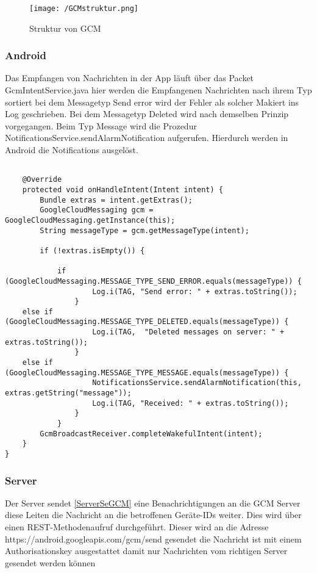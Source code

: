 \begin{figure}[H]
\centering
\texttt{[image: /GCMstruktur.png]}
\caption{Struktur von GCM}
\label{fig:GCMstrukutr}
\end{figure}

\subsubsection*{Android}
Das Empfangen von Nachrichten in der App läuft über das Packet GcmIntentService.java hier werden die Empfangenen Nachrichten nach ihrem Typ sortiert bei dem Messagetyp Send error wird der Fehler als solcher Makiert ins Log geschrieben. Bei dem Messagetyp Deleted wird nach demselben Prinzip vorgegangen. Beim Typ Message wird die Prozedur NotificationsService.sendAlarmNotification aufgerufen. Hierdurch werden in Android die Notifications ausgelöst.\\

\begin{lstlisting}[caption={Empfangen von GCM Nachrichten unter Android},label=lst:GCMget]

    @Override
    protected void onHandleIntent(Intent intent) {
        Bundle extras = intent.getExtras();
        GoogleCloudMessaging gcm = GoogleCloudMessaging.getInstance(this);
        String messageType = gcm.getMessageType(intent);

        if (!extras.isEmpty()) {

            if (GoogleCloudMessaging.MESSAGE_TYPE_SEND_ERROR.equals(messageType)) {
            		Log.i(TAG, "Send error: " + extras.toString());
	            }
 	else if (GoogleCloudMessaging.MESSAGE_TYPE_DELETED.equals(messageType)) {
            		Log.i(TAG,  "Deleted messages on server: " + extras.toString());
            	}
	else if (GoogleCloudMessaging.MESSAGE_TYPE_MESSAGE.equals(messageType)) {
            		NotificationsService.sendAlarmNotification(this, extras.getString("message"));
                	Log.i(TAG, "Received: " + extras.toString());
            	}
        	}
        GcmBroadcastReceiver.completeWakefulIntent(intent);
	} 
}

\end{lstlisting}

\subsubsection*{Server}
Der Server sendet \ref{ServerSeGCM} eine Benachrichtigungen an die GCM Server diese Leiten die Nachricht an die betroffenen Geräte-IDs weiter. Dies wird über einen REST-Methodenaufruf durchgeführt. Dieser wird an die Adresse https://android.googleapis.com/gcm/send gesendet die Nachricht ist mit einem Authorisationskey ausgestattet damit nur Nachrichten vom richtigen Server gesendet werden können 

